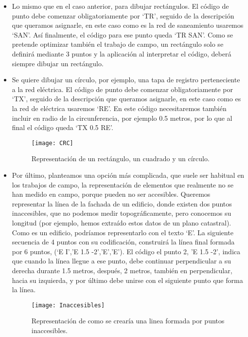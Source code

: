 \begin{itemize}
\item Lo mismo que en el caso anterior, para dibujar rectángulos. El código de punto debe comenzar obligatoriamente por ‘TR’, seguido de la descripción que queramos asignarle, en este caso como es la red de saneamiento usaremos ‘SAN’. Así finalmente, el código para ese punto queda ‘TR SAN’. Como se pretende optimizar también el trabajo de campo, un rectángulo solo se definirá mediante 3 puntos y la aplicación al interpretar el código, deberá siempre dibujar un rectángulo.

\item Se quiere dibujar un círculo, por ejemplo, una tapa de registro perteneciente a la red eléctrica.  El código de punto debe comenzar obligatoriamente por ‘TX’, seguido de la descripción que queramos asignarle, en este caso como es la red de eléctrica usaremos ‘RE’. En este código necesitaremos también incluir en radio de la circunferencia, por ejemplo 0.5 metros, por lo que al final el código queda ‘TX 0.5 RE’.


\begin{figure}[!h]
	\centering
	\texttt{[image: CRC]}
	\caption{Representación de un rectángulo, un cuadrado y un círculo.}
	\label{fig:CRC}
\end{figure}

\item Por último, planteamos una opción más complicada, que suele ser habitual en los trabajos de campo, la representación de elementos que realmente no se han medido en campo, porque pueden no ser accesibles. Queremos representar la línea de la fachada de un edificio, donde existen dos puntos inaccesibles, que no podemos medir topográficamente, pero conocemos su longitud (por ejemplo, hemos extraído estos datos de un plano catastral). Como es un edificio, podríamos representarlo con el texto ‘E’. La siguiente secuencia de 4 puntos con su codificación, construirá la línea final formada por 6 puntos, (‘E I’,’E 1.5 -2’,’E’,’E’). El código el punto 2, ’E 1.5 -2’, indica que cuando la línea llegue a ese punto, debe continuar perpendicular a su derecha durante 1.5 metros, después, 2 metros, también en perpendicular, hacia su izquierda, y por último debe unirse con el siguiente punto que forma la línea. 

\begin{figure}[!h]
	\centering
	\texttt{[image: Inaccesibles]}
	\caption{Representación de como se crearía una linea formada por puntos inaccesibles.}
	\label{fig:Inaccesibles}
\end{figure}


\end{itemize}


